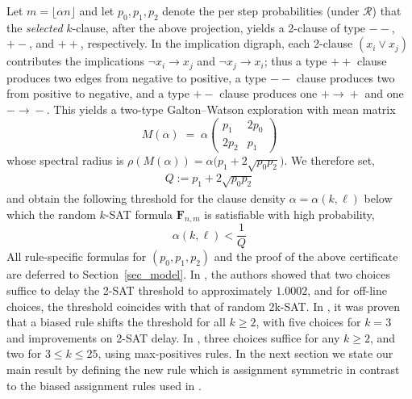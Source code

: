 \documentclass[11pt,reqno]{amsart}
\numberwithin{equation}{section}
\renewcommand{\vec}[1]{\boldsymbol{#1}}
\newcommand\cR{\mathcal R}
\newcommand\vF{\vec F}
\begin{document}
	Let $m=\lfloor \alpha n\rfloor$ and let $p_0,p_1,p_2$ denote the per step probabilities (under $\cR$) that the \emph{selected} $k$-clause, after the above projection, yields a 2-clause of type $--$, $+-$, and $++$, respectively.
	In the implication digraph, each 2-clause $(x_{i}\vee x_{j})$ contributes the implications $\neg x_{i}\to x_{j}$ and $\neg x_{j}\to x_{i}$; thus a type $++$ clause produces two edges from negative to positive, a type $--$ clause produces two from positive to negative, and a type $+-$ clause produces one $+\!\to\!+$ and one $-\!\to\!-$.
	This yields a two-type Galton--Watson exploration with mean matrix
	\[
	M(\alpha)\;=\;\alpha\begin{pmatrix} p_1 & 2p_0\\[2pt] 2p_2 & p_1\end{pmatrix}
	\]
	whose spectral radius is $\rho(M(\alpha))=\alpha\big(p_1+2\sqrt{p_0p_2}\big)$.
	We therefore set,
	\begin{align}\label{eq_q}
		Q:=p_1+2\sqrt{p_0p_2}
	\end{align}
	and obtain the following threshold for the clause density $\alpha=\alpha(k,\ell)$ below which the random $k$-SAT formula $\vF_{n,m}$ is satisfiable with high probability,
	\[
	\alpha(k,\ell)<\frac{1}{Q}
	\]
	All rule-specific formulas for $(p_0,p_1,p_2)$ and the proof of the above certificate are deferred to Section~\ref{sec_model}.
	In \cite{SV}, the authors showed that two choices suffice to delay the 2-SAT threshold to approximately $1.0002$, and for off-line choices, the threshold coincides with that of random 2k-SAT. In \cite{Perkins}, it was proven that a biased rule shifts the threshold for all $k \geq 2$, with five choices for $k=3$ and improvements on 2-SAT delay. In \cite{DDHM}, three choices suffice for any $k\geq 2$, and two for $3 \leq k \leq 25$, using max-positives rules.
	In the next section we state our main result by defining the new rule which is assignment symmetric in contrast to the biased assignment rules used in \cite{DDHM,Perkins,SV}.
	
\end{document}
